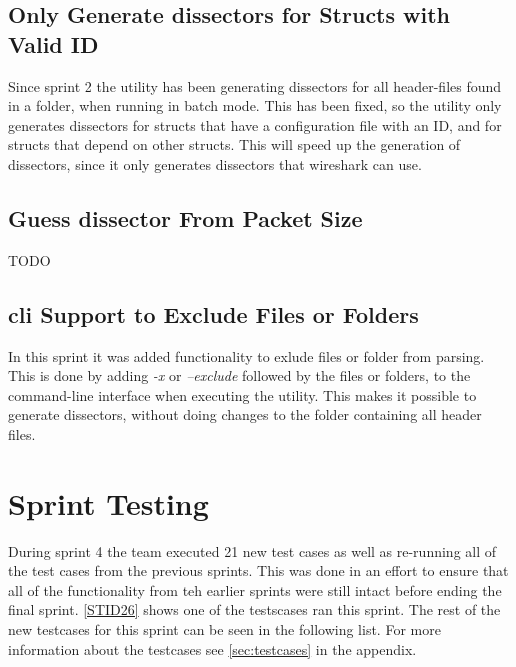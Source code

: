 \subsection{Only Generate \glspl{dissector} for Structs with Valid ID}
Since sprint 2 the \gls{utility} has been generating \glspl{dissector} for all \gls{header}-files 
found in a folder, when running in \gls{batch mode}. This has been fixed, so the \gls{utility} 
only generates \glspl{dissector} for \glspl{struct} that have a configuration file with an 
ID, and for \glspl{struct} that depend on other \glspl{struct}. This will speed up the 
generation of \glspl{dissector}, since it only generates \glspl{dissector} that \Gls{wireshark} 
can use.

\subsection{Guess \gls{dissector} From Packet Size}
TODO

\subsection{\gls{cli} Support to Exclude Files or Folders}
In this sprint it was added functionality to exlude files or folder from 
parsing. This is done by adding \emph{-x} or \emph{--exclude} followed by the 
files or folders, to the command-line interface when executing the utility. 
This makes it possible to generate dissectors, without doing changes to the 
folder containing all header files.


\section{Sprint Testing}
\label{sec:sp4test}

During sprint 4 the team executed 21 new test cases as well as re-running all of the test cases from the previous sprints. This was done in an effort to ensure that all of the functionality from teh earlier sprints were still intact before ending the final sprint. \autoref{STID26} shows one of the testscases ran this sprint. The rest of the new testcases for this sprint can be seen in the following list. For more information about the testcases see \autoref{sec:testcases} in the appendix.

